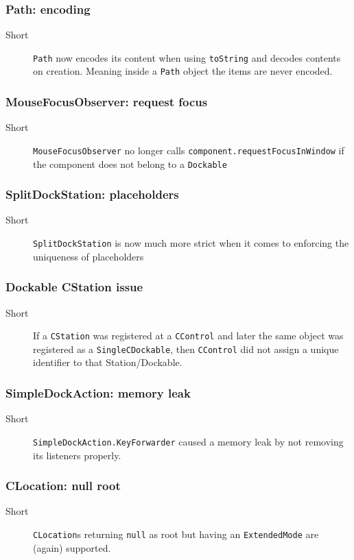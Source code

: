\documentclass[a4paper,10pt]{article}
\newcommand{\src}[1]{\lstinline[basicstyle=\normalsize\ttfamily,keywordstyle=\normalsize\ttfamily,identifierstyle=\normalsize\ttfamily]|#1|}
\newcommand{\short}{\item[Short]}
\begin{document}
\subsubsection{Path: encoding}
\begin{description}
 \short \src{Path} now encodes its content when using \src{toString} and decodes contents on creation. Meaning inside a \src{Path} object the items are never encoded.
\end{description}

\subsubsection{MouseFocusObserver: request focus}
\begin{description}
 \short \src{MouseFocusObserver} no longer calls \src{component.requestFocusInWindow} if the component does not belong to a \src{Dockable}
\end{description}

\subsubsection{SplitDockStation: placeholders}
\begin{description}
 \short \src{SplitDockStation} is now much more strict when it comes to enforcing the uniqueness of placeholders
\end{description}

\subsubsection{Dockable CStation issue}
\begin{description}
 \short If a \src{CStation} was registered at a \src{CControl} and later the same object was registered as a \src{SingleCDockable}, then \src{CControl} did not assign a unique identifier to that Station/Dockable. 
\end{description}

\subsubsection{SimpleDockAction: memory leak}
\begin{description}
 \short \src{SimpleDockAction.KeyForwarder} caused a memory leak by not removing its listeners properly.
\end{description}

\subsubsection{CLocation: null root}
\begin{description}
 \short \src{CLocation}s returning \src{null} as root but having an \src{ExtendedMode} are (again) supported.
\end{description}
\end{document}
